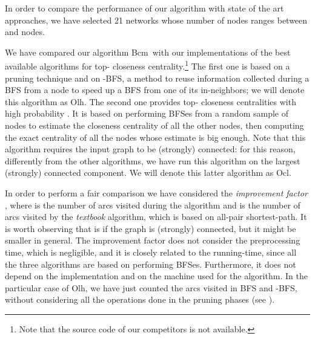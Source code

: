 \documentclass{acm_proc_article-sp}
\newcommand{\deltabfs}{{\sc Olh}}
\newcommand{\sampl}{{\sc Ocl}}
\newcommand{\newalg}{{\sc Bcm}}
\begin{document}
In order to compare the performance of our algorithm with state of the art approaches, we have selected 21 networks whose number of nodes ranges between  and  nodes.

We have compared our algorithm \newalg\ with our implementations of the best available algorithms for top- closeness centrality.\footnote{Note that the source code of our competitors is not available.} The first one \cite{Olsen2014} is based on a pruning technique and on -BFS, a method to reuse information collected during a BFS from a node to speed up a BFS from one of its in-neighbors; we will denote this algorithm as \deltabfs. The second one provides top- closeness centralities with high probability \cite{Okamoto2008}. It is based on performing BFSes from a random sample of nodes to estimate the closeness centrality of all the other nodes, then computing the exact centrality of all the nodes whose estimate is big enough. Note that this algorithm requires the input graph to be (strongly) connected: for this reason, differently from the other algorithms, we have run this algorithm on the largest (strongly) connected component. We will denote this latter algorithm as \sampl.

In order to perform a fair comparison we have considered the \emph{improvement factor} , where  is the number of arcs visited during the algorithm and  is the number of arcs visited by the \emph{textbook} algorithm, which is based on all-pair shortest-path. It is worth observing that  is  if the graph is (strongly) connected, but it might be smaller in general. The improvement factor does not consider the preprocessing time, which is negligible, and it is closely related to the running-time, since all the three algorithms are based on performing BFSes. Furthermore, it does not depend on the implementation and on the machine used for the algorithm. In the particular case of \deltabfs, we have just counted the arcs visited in BFS and -BFS, without considering all the operations done in the pruning phases (see \cite{Olsen2014}).
\end{document}
